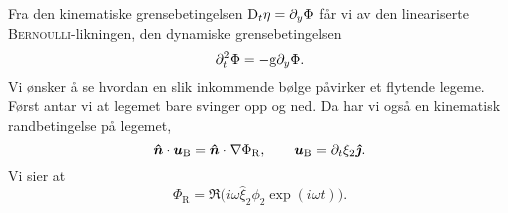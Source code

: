 Fra den kinematiske grensebetingelsen $\mathrm{D}_t \eta = \partial_y\Phi$ får vi av den lineariserte \textsc{Bernoulli}-likningen, den dynamiske grensebetingelsen
\[
\partial_t^2 \Phi = -\mathrm{g}\partial_y\Phi.
\]
Vi ønsker å se hvordan en slik inkommende bølge påvirker et flytende legeme.
Først antar vi at legemet bare svinger opp og ned.
Da har vi også en kinematisk randbetingelse på legemet,
\[
\bm{\hat{n}}\cdot\bm{u}_{\mathrm{B}} = \bm{\hat{n}}\cdot\nabla\Phi_{\mathrm{R}}, \qquad \bm{u}_{\mathrm{B}} = \partial_t\xi_2 \bm{\hat{\jmath}}.
\]
Vi sier at
\[
        \Phi_{\mathrm{R}} = \Re{\big( i \omega \hat{\xi}_2 \phi_2 \exp{(i \omega t)}\big)}.
\]
\begin{figure}[H]
\end{figure}
